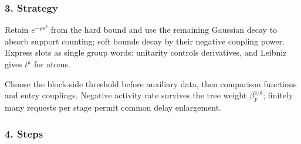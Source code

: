 \documentclass[
  letterpaper,
  11pt]{article}
\begin{document}
\subsubsection{3. Strategy}\label{strategy-17}

Retain \(e^{-\rho s^2}\) from the hard bound and use the remaining
Gaussian decay to absorb support counting; soft bounds decay by their
negative coupling power. Express slots as single group words: unitarity
controls derivatives, and Leibniz gives \(t^k\) for atoms.

Choose the block-side threshold before auxiliary data, then comparison
functions and entry couplings. Negative activity rate survives the tree
weight \(\beta_F^{3/8}\); finitely many requests per stage permit common
delay enlargement.

\subsubsection{4. Steps}\label{steps-17}
\end{document}
